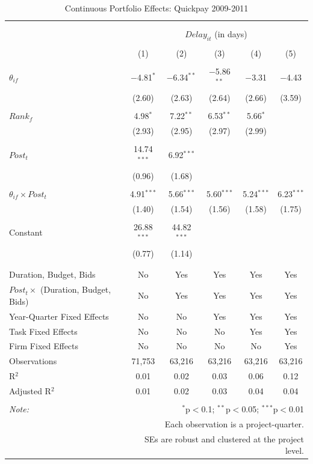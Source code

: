 \documentclass[
]{article}
\begin{document}
\begin{table}[H] \centering 
  \caption{Continuous Portfolio Effects: Quickpay 2009-2011} 
  \label{} 
\small 
\begin{tabular}{@{\extracolsep{-2pt}}lccccc} 
\\[-1.8ex]\hline 
\hline \\[-1.8ex] 
\\[-1.8ex] & \multicolumn{5}{c}{$Delay_{it}$ (in days)} \\ 
\\[-1.8ex] & (1) & (2) & (3) & (4) & (5)\\ 
\hline \\[-1.8ex] 
 $\theta_{if}$ & $-$4.81$^{*}$ & $-$6.34$^{**}$ & $-$5.86$^{**}$ & $-$3.31 & $-$4.43 \\ 
  & (2.60) & (2.63) & (2.64) & (2.66) & (3.59) \\ 
  & & & & & \\ 
 $Rank_f$ & 4.98$^{*}$ & 7.22$^{**}$ & 6.53$^{**}$ & 5.66$^{*}$ &  \\ 
  & (2.93) & (2.95) & (2.97) & (2.99) &  \\ 
  & & & & & \\ 
 $Post_t$ & 14.74$^{***}$ & 6.92$^{***}$ &  &  &  \\ 
  & (0.96) & (1.68) &  &  &  \\ 
  & & & & & \\ 
 $\theta_{if} \times Post_t$ & 4.91$^{***}$ & 5.66$^{***}$ & 5.60$^{***}$ & 5.24$^{***}$ & 6.23$^{***}$ \\ 
  & (1.40) & (1.54) & (1.56) & (1.58) & (1.75) \\ 
  & & & & & \\ 
 Constant & 26.88$^{***}$ & 44.82$^{***}$ &  &  &  \\ 
  & (0.77) & (1.14) &  &  &  \\ 
  & & & & & \\ 
\hline \\[-1.8ex] 
Duration, Budget, Bids & No & Yes & Yes & Yes & Yes \\ 
$Post_t \times$  (Duration, Budget, Bids) & No & Yes & Yes & Yes & Yes \\ 
Year-Quarter Fixed Effects & No & No & Yes & Yes & Yes \\ 
Task Fixed Effects & No & No & No & Yes & Yes \\ 
Firm Fixed Effects & No & No & No & No & Yes \\ 
Observations & 71,753 & 63,216 & 63,216 & 63,216 & 63,216 \\ 
R$^{2}$ & 0.01 & 0.02 & 0.03 & 0.06 & 0.12 \\ 
Adjusted R$^{2}$ & 0.01 & 0.02 & 0.03 & 0.04 & 0.04 \\ 
\hline 
\hline \\[-1.8ex] 
\textit{Note:}  & \multicolumn{5}{r}{$^{*}$p$<$0.1; $^{**}$p$<$0.05; $^{***}$p$<$0.01} \\ 
 & \multicolumn{5}{r}{Each observation is a project-quarter.} \\ 
 & \multicolumn{5}{r}{SEs are robust and clustered at the project level.} \\ 
\end{tabular} 
\end{table}
\end{document}
